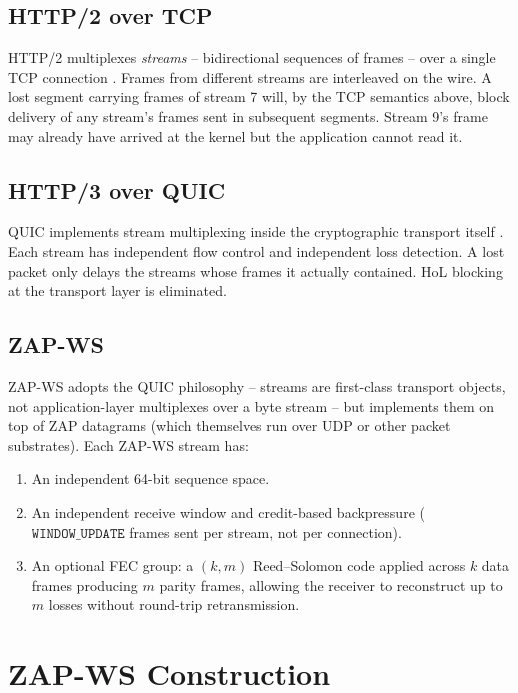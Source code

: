 \documentclass[11pt,a4paper]{article}
\begin{document}
\subsection{HTTP/2 over TCP}

HTTP/2 multiplexes \emph{streams} -- bidirectional sequences of frames --
over a single TCP connection \cite{rfc9113}. Frames from different
streams are interleaved on the wire. A lost segment carrying frames of
stream 7 will, by the TCP semantics above, block delivery of any stream's
frames sent in subsequent segments. Stream 9's frame may already have
arrived at the kernel but the application cannot read it.

\subsection{HTTP/3 over QUIC}

QUIC implements stream multiplexing inside the cryptographic transport
itself \cite{rfc9000}. Each stream has independent flow control and
independent loss detection. A lost packet only delays the streams whose
frames it actually contained. HoL blocking at the transport layer is
eliminated.

\subsection{ZAP-WS}

ZAP-WS adopts the QUIC philosophy -- streams are first-class transport
objects, not application-layer multiplexes over a byte stream -- but
implements them on top of ZAP datagrams (which themselves run over UDP
or other packet substrates). Each ZAP-WS stream has:

\begin{enumerate}
\item An independent 64-bit sequence space.
\item An independent receive window and credit-based backpressure
($\texttt{WINDOW\_UPDATE}$ frames sent per stream, not per connection).
\item An optional FEC group: a $(k, m)$ Reed--Solomon code applied
across $k$ data frames producing $m$ parity frames, allowing the
receiver to reconstruct up to $m$ losses without round-trip
retransmission.
\end{enumerate}

\section{ZAP-WS Construction}
\label{sec:construction}
\end{document}
